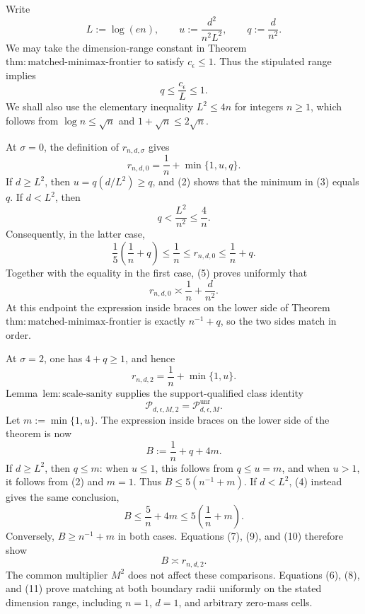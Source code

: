 Write
\[
 L:=\log(en),\qquad
 u:=\frac{d^2}{n^2L^2},\qquad
 q:=\frac d{n^2}.
\tag{1}
\]
We may take the dimension-range constant in Theorem~\(\mathrm{thm:matched\text{-}minimax\text{-}frontier}\) to satisfy \(c_{\epsilon}\le1\).  Thus the stipulated range implies
\[
 q\le\frac{c_{\epsilon}}L\le1.
\tag{2}
\]
We shall also use the elementary inequality \(L^2\le4n\) for integers \(n\ge1\), which follows from \(\log n\le\sqrt n\) and \(1+\sqrt n\le2\sqrt n\).

At \(\sigma=0\), the definition of \(r_{n,d,\sigma}\) gives
\[
 r_{n,d,0}=\frac1n+\min\{1,u,q\}.
\tag{3}
\]
If \(d\ge L^2\), then \(u=q(d/L^2)\ge q\), and (2) shows that the minimum in (3) equals \(q\).  If \(d<L^2\), then
\[
 q<\frac{L^2}{n^2}\le\frac4n.
\tag{4}
\]
Consequently, in the latter case,
\[
 \frac15\left(\frac1n+q\right)
 \le \frac1n
 \le r_{n,d,0}
 \le \frac1n+q.
\tag{5}
\]
Together with the equality in the first case, (5) proves uniformly that
\[
 r_{n,d,0}\asymp \frac1n+\frac d{n^2}.
\tag{6}
\]
At this endpoint the expression inside braces on the lower side of Theorem~\(\mathrm{thm:matched\text{-}minimax\text{-}frontier}\) is exactly \(n^{-1}+q\), so the two sides match in order.

At \(\sigma=2\), one has \(4+q\ge1\), and hence
\[
 r_{n,d,2}=\frac1n+\min\{1,u\}.
\tag{7}
\]
Lemma~\(\mathrm{lem:scale\text{-}sanity}\) supplies the support-qualified class identity
\[
 \mathcal P_{d,\epsilon,M,2}
 =\mathcal P_{d,\epsilon,M}^{\mathrm{unr}}.
\tag{8}
\]
Let \(m:=\min\{1,u\}\).  The expression inside braces on the lower side of the theorem is now
\[
 B:=\frac1n+q+4m.
\tag{9}
\]
If \(d\ge L^2\), then \(q\le m\): when \(u\le1\), this follows from \(q\le u=m\), and when \(u>1\), it follows from (2) and \(m=1\).  Thus \(B\le5(n^{-1}+m)\).  If \(d<L^2\), (4) instead gives the same conclusion,
\[
 B\le\frac5n+4m\le5\left(\frac1n+m\right).
\tag{10}
\]
Conversely, \(B\ge n^{-1}+m\) in both cases.  Equations (7), (9), and (10) therefore show
\[
 B\asymp r_{n,d,2}.
\tag{11}
\]
The common multiplier \(M^2\) does not affect these comparisons.  Equations (6), (8), and (11) prove matching at both boundary radii uniformly on the stated dimension range, including \(n=1\), \(d=1\), and arbitrary zero-mass cells.